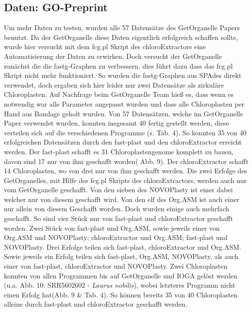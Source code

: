 \documentclass{scrartcl}
\begin{document}
\subsection{Daten: GO-Preprint}
\label{sec-4-4}
Um mehr Daten zu testen, wurden alle 57 Datensätze des GetOrganelle Papers \footnotemark[32]{} benutzt. Da der GetOrganelle diese Daten eigentlich erfolgreich schaffen sollte,
wurde hier versucht mit dem fcg.pl Skript des chloroExtractors eine Automatisierung der Daten zu erwirken. Doch versucht der GetOrganelle zunächst die die fastg-Graphen
zu verbessern, dies führt dazu dass das fcg.pl Skript nicht mehr funktioniert. So wurden die fastg-Graphen aus SPAdes direkt verwendet, doch ergaben sich hier leider nur
zwei Datensätze als zirkuläre Chloroplasten. Auf Nachfrage beim GetOrganelle Team hieß es, dass wenn es notwendig war alle Parameter angepasst wurden und dass alle 
Chloroplasten per Hand aus Bandage geholt wurden. 
Von 57 Datensätzen, welche im GetOrganelle Paper verwendet wurden, konnten insgesamt 40 fertig gestellt werden, diese verteilen sich auf die verschiedenen Programme (s. Tab. 4).
So konnten 35 von 40 erfolgreichen Datensätzen durch den fast-plast und den chloroExtractor erreicht werden.  Der fast-plast schafft es 31 Chloroplastengenome komplett
zu bauen, davon sind 17 nur von ihm geschafft worden( Abb. 9). Der chloroExtractor schafft 14 Chloroplasten, wo von drei nur von ihm geschafft werden. Die zwei Erfolge des GetOrganelles,
mit Hilfe des fcg.pl Skripts des chloroExtractors, werden auch nur vom GetOrganelle geschafft. Von den sieben des NOVOPlasty ist einer dabei welcher nur von diesem geschafft wird.
Von den elf des Org.ASM ist auch einer nur allein von diesem Geschafft worden. Doch wurden einige auch mehrfach geschafft. So sind vier Stück nur von fast-plast und chloroExtractor geschafft worden.
Zwei Stück von fast-plast und Org.ASM, sowie jeweils einer von Org.ASM und NOVOPlasty; chloroExtractor und Org.ASM; fast-plast und NOVOPlasty.
Drei Erfolge teilen sich fast-plast, chloroExtractor und Org.ASM. Sowie jeweils ein Erfolg teilen sich fast-plast, Org.ASM, NOVOPlasty, als auch einer von fast-plast, chloroExtractor und NOVOPlasty.
Zwei Chloroplasten konnten von allen Programmen bis auf GetOrganelle und IOGA gelöst werden (u.a. Abb. 10: SRR5602602 - \emph{Laurus nobilis}), wobei letzteres Programm nicht einen Erfolg hat(Abb. 9 \& Tab. 4). 
So können bereits 35 von 40 Chloroplasten alleine durch fast-plast und chloroExtractor geschafft werden.
\end{document}
